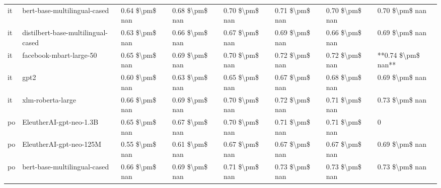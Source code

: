 \begin{tabular}{llllllll}
      it &       bert-base-multilingual-cased & 0.64 \$\textbackslash pm\$ nan &            0.68 \$\textbackslash pm\$ nan &        0.70 \$\textbackslash pm\$ nan &         0.71 \$\textbackslash pm\$ nan &                          0.70 \$\textbackslash pm\$ nan &     0.70 \$\textbackslash pm\$ nan \\
      it & distilbert-base-multilingual-cased & 0.63 \$\textbackslash pm\$ nan &            0.66 \$\textbackslash pm\$ nan &        0.67 \$\textbackslash pm\$ nan &         0.69 \$\textbackslash pm\$ nan &                          0.66 \$\textbackslash pm\$ nan &     0.69 \$\textbackslash pm\$ nan \\
      it &            facebook-mbart-large-50 & 0.65 \$\textbackslash pm\$ nan &            0.69 \$\textbackslash pm\$ nan &        0.70 \$\textbackslash pm\$ nan &         0.72 \$\textbackslash pm\$ nan &                          0.72 \$\textbackslash pm\$ nan & **0.74 \$\textbackslash pm\$ nan** \\
      it &                               gpt2 & 0.60 \$\textbackslash pm\$ nan &            0.63 \$\textbackslash pm\$ nan &        0.65 \$\textbackslash pm\$ nan &         0.67 \$\textbackslash pm\$ nan &                          0.68 \$\textbackslash pm\$ nan &     0.69 \$\textbackslash pm\$ nan \\
      it &                  xlm-roberta-large & 0.66 \$\textbackslash pm\$ nan &            0.69 \$\textbackslash pm\$ nan &        0.70 \$\textbackslash pm\$ nan &         0.72 \$\textbackslash pm\$ nan &                          0.71 \$\textbackslash pm\$ nan &     0.73 \$\textbackslash pm\$ nan \\
      po &            EleutherAI-gpt-neo-1.3B & 0.65 \$\textbackslash pm\$ nan &            0.67 \$\textbackslash pm\$ nan &        0.70 \$\textbackslash pm\$ nan &         0.71 \$\textbackslash pm\$ nan &                          0.71 \$\textbackslash pm\$ nan &                  0 \\
      po &            EleutherAI-gpt-neo-125M & 0.55 \$\textbackslash pm\$ nan &            0.61 \$\textbackslash pm\$ nan &        0.67 \$\textbackslash pm\$ nan &         0.67 \$\textbackslash pm\$ nan &                          0.67 \$\textbackslash pm\$ nan &     0.69 \$\textbackslash pm\$ nan \\
      po &       bert-base-multilingual-cased & 0.66 \$\textbackslash pm\$ nan &            0.69 \$\textbackslash pm\$ nan &        0.71 \$\textbackslash pm\$ nan &         0.73 \$\textbackslash pm\$ nan &                          0.73 \$\textbackslash pm\$ nan &     0.73 \$\textbackslash pm\$ nan \\

\end{tabular}
